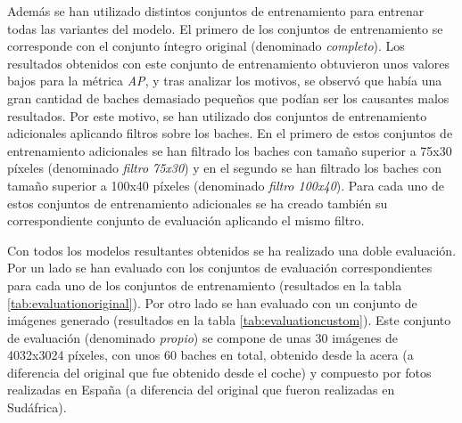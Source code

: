 Además se han utilizado distintos conjuntos de entrenamiento para entrenar todas las variantes del modelo. El primero de los conjuntos de entrenamiento se corresponde con el conjunto íntegro original (denominado \textit{completo}). Los resultados obtenidos con este conjunto de entrenamiento obtuvieron unos valores bajos para la métrica \textit{AP}, y tras analizar los motivos, se observó que había una gran cantidad de baches demasiado pequeños que podían ser los causantes malos resultados. Por este motivo, se han utilizado dos conjuntos de entrenamiento adicionales aplicando filtros sobre los baches. En el primero de estos conjuntos de entrenamiento adicionales se han filtrado los baches con tamaño superior a 75x30 píxeles (denominado \textit{filtro 75x30}) y en el segundo se han filtrado los baches con tamaño superior a 100x40 píxeles (denominado \textit{filtro 100x40}). Para cada uno de estos conjuntos de entrenamiento adicionales se ha creado también su correspondiente conjunto de evaluación aplicando el mismo filtro.

Con todos los modelos resultantes obtenidos se ha realizado una doble evaluación. Por un lado se han evaluado con los conjuntos de evaluación correspondientes para cada uno de los conjuntos de entrenamiento (resultados en la tabla \ref{tab:evaluationoriginal}). Por otro lado se han evaluado con un conjunto de imágenes generado (resultados en la tabla \ref{tab:evaluationcustom}). Este conjunto de evaluación (denominado \textit{propio}) se compone de unas 30 imágenes de 4032x3024 píxeles, con unos 60 baches en total, obtenido desde la acera (a diferencia del original que fue obtenido desde el coche) y compuesto por fotos realizadas en España (a diferencia del original que fueron realizadas en Sudáfrica).

